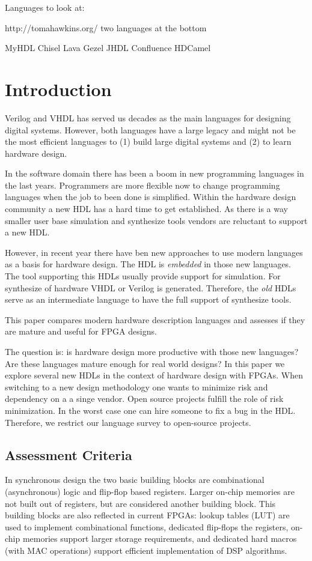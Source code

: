 \documentclass[10pt, conference, compsocconf]{IEEEtran}
\begin{document}
Languages to look at:

http://tomahawkins.org/ two languages at the bottom

MyHDL
Chisel
Lava
Gezel
JHDL
Confluence
HDCamel


\section{Introduction}

Verilog and VHDL has served us decades as the main languages for designing
digital systems. However, both languages have a large legacy and might not be
the most efficient languages to (1) build large digital systems and (2) to learn
hardware design.

In the software domain there has been a boom in new programming languages
in the last years. Programmers are more flexible now to change programming
languages when the job to been done is simplified. Within the hardware design
community a new HDL has a hard time to get established. As there is a way
smaller user base simulation and synthesize tools vendors are reluctant to
support a new HDL.

However, in recent year there have ben new approaches to use modern
languages as a basis for hardware design. The HDL is \emph{embedded}
in those new languages. The tool supporting this HDLs usually provide
support for simulation. For synthesize of hardware VHDL or Verilog is
generated. Therefore, the \emph{old} HDLs serve as an intermediate
language to have the full support of synthesize tools.

This paper compares modern hardware description languages and
assesses if they are mature and useful for FPGA designs.

The question is: is hardware design more productive with those new
languages? Are these languages mature enough for real world designs?
In this paper we explore several new HDLs in the context of hardware
design with FPGAs. When switching to a new design methodology one
wants to minimize risk and dependency on a a singe vendor. Open source
projects fulfill the role of risk minimization. In the worst case one can hire
someone to fix a bug in the HDL. Therefore, we restrict our language survey
to open-source projects.

\subsection{Assessment Criteria}


In synchronous design the two basic building blocks are combinational
(asynchronous) logic and flip-flop based registers. Larger on-chip
memories are not built out of registers, but are considered another building
block. This building blocks are also reflected in current FPGAs: lookup tables
(LUT) are used to implement combinational functions, dedicated flip-flops
the registers, on-chip memories support larger storage requirements,
and dedicated hard macros (with MAC operations) support efficient
implementation of DSP algorithms.
\end{document}
